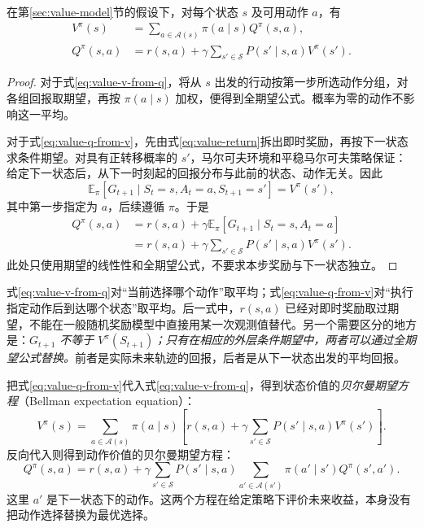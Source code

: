 \documentclass[UTF8,12pt,a4paper,fontset=fandol]{ctexart}
\begin{document}
\begin{proposition}[按动作平均与按下一状态平均]
\label{prop:value-relations}
在第\ref{sec:value-model}节的假设下，对每个状态 $s$ 及可用动作 $a$，有
\begin{align}
  V^\pi(s)
    &=\sum_{a\in\mathcal A(s)}\pi(a\mid s)Q^\pi(s,a),
    \label{eq:value-v-from-q}\\
  Q^\pi(s,a)
    &=r(s,a)+\gamma\sum_{s'\in\mathcal S}P(s'\mid s,a)V^\pi(s').
    \label{eq:value-q-from-v}
\end{align}
\end{proposition}

\begin{proof}
对于式\eqref{eq:value-v-from-q}，将从 $s$ 出发的行动按第一步所选动作分组，对各组回报取期望，再按 $\pi(a\mid s)$ 加权，便得到全期望公式。概率为零的动作不影响这一平均。

对于式\eqref{eq:value-q-from-v}，先由式\eqref{eq:value-return}拆出即时奖励，再按下一状态求条件期望。对具有正转移概率的 $s'$，马尔可夫环境和平稳马尔可夫策略保证：给定下一状态后，从下一时刻起的回报分布与此前的状态、动作无关。因此
\[
  \mathbb E_\pi[G_{t+1}\mid S_t=s,A_t=a,S_{t+1}=s']
  =V^\pi(s'),
\]
其中第一步指定为 $a$，后续遵循 $\pi$。于是
\[
  \begin{aligned}
    Q^\pi(s,a)
      &=r(s,a)+\gamma\mathbb E_\pi[G_{t+1}\mid S_t=s,A_t=a]\\
      &=r(s,a)+\gamma\sum_{s'\in\mathcal S}P(s'\mid s,a)V^\pi(s').
  \end{aligned}
\]
此处只使用期望的线性性和全期望公式，不要求本步奖励与下一状态独立。
\end{proof}

式\eqref{eq:value-v-from-q}对“当前选择哪个动作”取平均；式\eqref{eq:value-q-from-v}对“执行指定动作后到达哪个状态”取平均。后一式中，$r(s,a)$ 已经对即时奖励取过期望，不能在一般随机奖励模型中直接用某一次观测值替代。另一个需要区分的地方是：\emph{$G_{t+1}$ 不等于 $V^\pi(S_{t+1})$；只有在相应的外层条件期望中，两者可以通过全期望公式替换。}前者是实际未来轨迹的回报，后者是从下一状态出发的平均回报。

把式\eqref{eq:value-q-from-v}代入式\eqref{eq:value-v-from-q}，得到状态价值的\emph{贝尔曼期望方程}（Bellman expectation equation）：
\begin{equation}
  V^\pi(s)=\sum_{a\in\mathcal A(s)}\pi(a\mid s)
  \left[r(s,a)+\gamma\sum_{s'\in\mathcal S}P(s'\mid s,a)V^\pi(s')\right].
  \label{eq:value-bellman-v}
\end{equation}
反向代入则得到动作价值的贝尔曼期望方程：
\begin{equation}
  Q^\pi(s,a)=r(s,a)+\gamma\sum_{s'\in\mathcal S}P(s'\mid s,a)
  \sum_{a'\in\mathcal A(s')}\pi(a'\mid s')Q^\pi(s',a').
  \label{eq:value-bellman-q}
\end{equation}
这里 $a'$ 是下一状态下的动作。这两个方程在给定策略下评价未来收益，本身没有把动作选择替换为最优选择。
\end{document}
